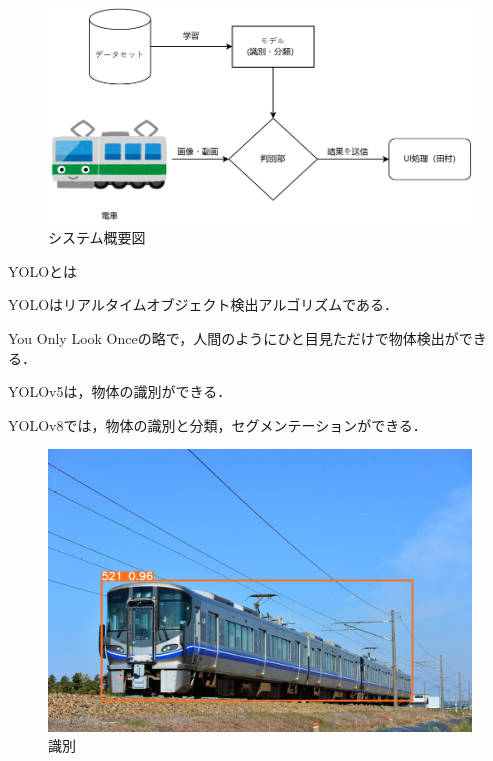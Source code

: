 \begin{figure}[h]
\begin{center}
\includegraphics[scale = 1.3]{fig/system_2.drawio.pdf}
\caption{システム概要図}
\end{center}
\end{figure}
\newpage

{\Large YOLOとは}
\begin{description}
	\item YOLOはリアルタイムオブジェクト検出アルゴリズムである．
	\item You Only Look Onceの略で，人間のようにひと目見ただけで物体検出ができる．
	\item YOLOv5は，物体の識別ができる．
	\item YOLOv8では，物体の識別と分類，セグメンテーションができる．
	\newpage
\end{description}

\begin{figure}
		\begin{center}
			\includegraphics[width=200mm]{fig/521_0.jpg}
		\end{center}
		\caption{識別}
		\label{fig:one}
\end{figure}

